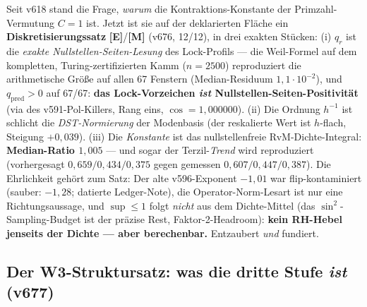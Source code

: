 \documentclass[11pt,a4paper]{article}
\newcommand{\E}{\textcolor{gut}{\textbf{[E]}}}
\newcommand{\M}{\textcolor{mess}{\textbf{[M]}}}
\begin{document}
Seit v618 stand die Frage, \emph{warum} die Kontraktions-Konstante
der Primzahl-Vermutung $C = 1$ ist. Jetzt ist sie auf der
deklarierten Fläche ein \textbf{Diskretisierungssatz} \E{}/\M{}
(v676, 12/12), in drei exakten Stücken: (i) $q_r$ ist die
\emph{exakte Nullstellen-Seiten-Lesung} des Lock-Profils --- die
Weil-Formel auf dem kompletten, Turing-zertifizierten Kamm
($n = 2500$) reproduziert die arithmetische Größe auf allen 67
Fenstern (Median-Residuum $1{,}1 \cdot 10^{-2}$), und $q_{\mathrm{pred}}
> 0$ auf 67/67: \textbf{das Lock-Vorzeichen \emph{ist}
Nullstellen-Seiten-Positivität} (via des v591-Pol-Killers, Rang
eins, $\cos = 1{,}000000$). (ii) Die Ordnung $h^{-1}$ ist schlicht
die \emph{DST-Normierung} der Modenbasis (der reskalierte Wert ist
$h$-flach, Steigung $+0{,}039$). (iii) Die \emph{Konstante} ist das
nullstellenfreie RvM-Dichte-Integral: \textbf{Median-Ratio
$1{,}005$} --- und sogar der Terzil-\emph{Trend} wird reproduziert
(vorhergesagt $0{,}659/0{,}434/0{,}375$ gegen gemessen
$0{,}607/0{,}447/0{,}387$). Die Ehrlichkeit gehört zum Satz: Der
alte v596-Exponent $-1{,}01$ war flip-kontaminiert (sauber:
$-1{,}28$; datierte Ledger-Note), die Operator-Norm-Lesart ist nur
eine Richtungsaussage, und $\sup \le 1$ folgt \emph{nicht} aus dem
Dichte-Mittel (das $\sin^2$-Sampling-Budget ist der präzise Rest,
Faktor-2-Headroom): \textbf{kein RH-Hebel jenseits der Dichte ---
aber berechenbar.} Entzaubert \emph{und} fundiert.

\subsection*{Der W3-Struktursatz: was die dritte Stufe \emph{ist}
(v677)}
\end{document}
